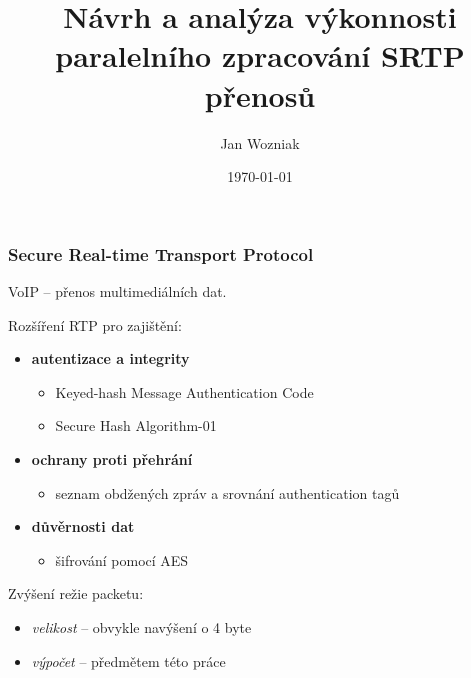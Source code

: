 \documentclass[10pt, xcolor=pdflatex, dvipsnames, table]{beamer}
\title{Návrh a analýza výkonnosti paralelního
zpracování SRTP přenosů}
\author{Jan Wozniak}
\institute[FIT VUT]{Vysoké učení technické v~Brně\\
Fakulta informační technologií}
\date{\today}
\begin{document}
\begin{frame}[plain]
\titlepage
\end{frame}


\begin{frame}
\frametitle{Secure Real-time Transport Protocol}
VoIP -- přenos multimediálních dat. 

\vspace{1.5em}

Rozšíření RTP pro zajištění:
\begin{itemize}
\item \textbf{autentizace a integrity}
    \begin{itemize}
        \item Keyed-hash Message Authentication Code
        \item Secure Hash Algorithm-01
    \end{itemize}
\item \textbf{ochrany proti přehrání}
    \begin{itemize}
        \item seznam obdžených zpráv a srovnání authentication tagů
    \end{itemize}
\item \textbf{důvěrnosti dat}
    \begin{itemize}
        \item šifrování pomocí AES
    \end{itemize}
\end{itemize}

\vspace{1.5em}

Zvýšení režie packetu:
\begin{itemize}
\item \textit{velikost} -- obvykle navýšení o 4 byte
\item \textit{výpočet} -- předmětem této práce 
\end{itemize}
\end{frame}
\end{document}
